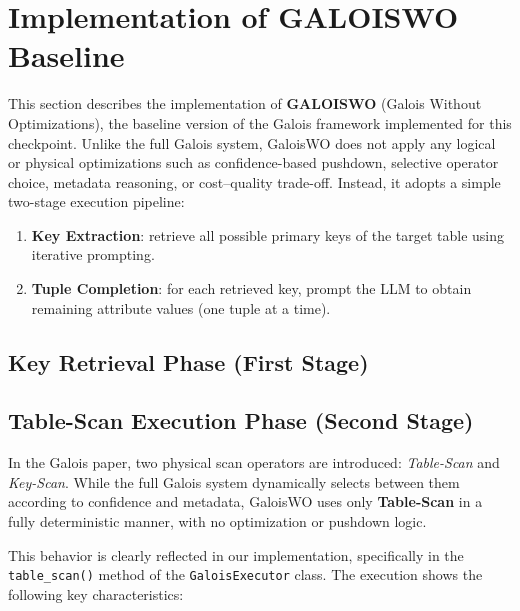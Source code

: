 \section{Implementation of GALOISWO Baseline}
This section describes the implementation of \textbf{GALOISWO} (Galois Without Optimizations), the baseline version of the Galois framework implemented for this checkpoint. Unlike the full Galois system, GaloisWO does not apply any logical or physical optimizations such as confidence-based pushdown, selective operator choice, metadata reasoning, or cost–quality trade-off. Instead, it adopts a simple two-stage execution pipeline:

\begin{enumerate}
    \item \textbf{Key Extraction}: retrieve all possible primary keys of the target table using iterative prompting.
    \item \textbf{Tuple Completion}: for each retrieved key, prompt the LLM to obtain remaining attribute values (one tuple at a time).
\end{enumerate}


\subsection{Key Retrieval Phase (First Stage)}

\subsection{Table-Scan Execution Phase (Second Stage)}
In the Galois paper, two physical scan operators are introduced: \textit{Table-Scan}
and \textit{Key-Scan}. While the full Galois system dynamically selects between
them according to confidence and metadata, GaloisWO uses only \textbf{Table-Scan}
in a fully deterministic manner, with no optimization or pushdown logic.

This behavior is clearly reflected in our implementation,
specifically in the \texttt{table\_scan()} method of the
\texttt{GaloisExecutor} class. The execution shows the following key characteristics:

